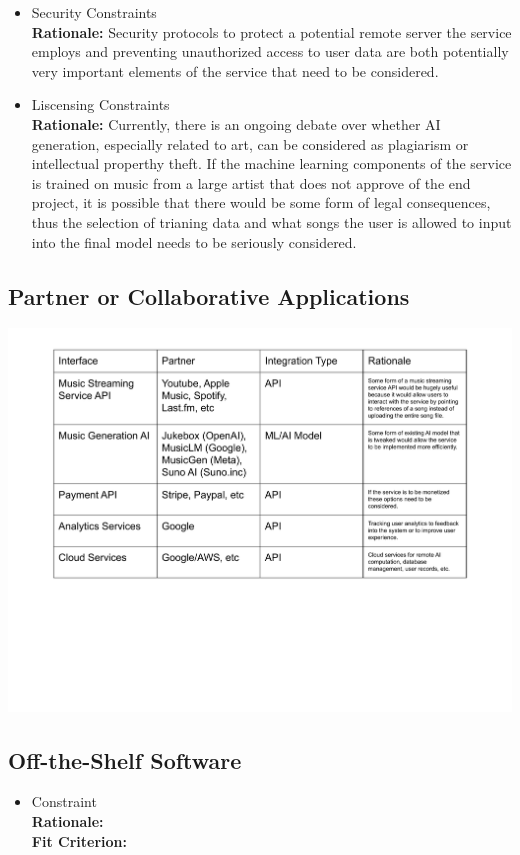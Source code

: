 \documentclass[12pt]{article}
\begin{document}
\begin{itemize}
  \item Security Constraints
  \\ \textbf{Rationale:} Security protocols to protect a potential remote server the service employs and preventing unauthorized access to 
  user data are both potentially very important elements of the service that need to be considered. 

  \item Liscensing Constraints 
  \\ \textbf{Rationale:} Currently, there is an ongoing debate over whether AI generation, especially related to art, can be considered 
  as plagiarism or intellectual properthy theft. If the machine learning components of the service is trained on music from a large artist 
  that does not approve of the end project, it is possible that there would be some form of legal consequences, thus the selection of 
  trianing data and what songs the user is allowed to input into the final model needs to be seriously considered. 

\end{itemize}

\subsection{Partner or Collaborative Applications}

\includegraphics[scale=0.72]{3_3_partner_constraints_figure}


\subsection{Off-the-Shelf Software}
\begin{itemize}
  \item Constraint
  \\ \textbf{Rationale:} 
  \\ \textbf{Fit Criterion:} 
\end{itemize}
\end{document}
